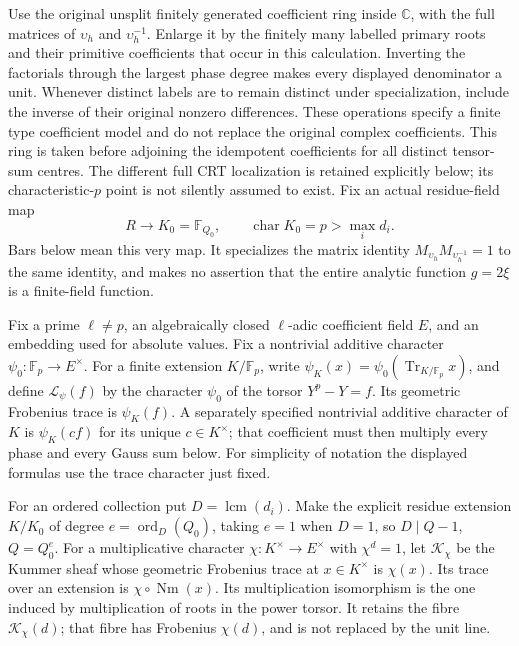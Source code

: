\documentclass[11pt,a4paper]{article}
\theoremstyle{definition}
\begin{document}
Use the original unsplit finitely generated coefficient ring inside
\(\mathbb C\), with the full matrices of \(\upsilon_h\) and
\(\upsilon_h^{-1}\).  Enlarge it by the finitely many labelled primary
roots and their primitive coefficients that occur in this calculation.
Inverting the factorials through the largest phase degree makes every
displayed denominator a unit.  Whenever distinct labels are to remain
distinct under specialization, include the inverse of their original
nonzero differences.  These operations specify a finite type coefficient
model and do not replace the original complex coefficients.
This ring is taken before adjoining the idempotent coefficients for
all distinct tensor-sum centres.  The different full CRT localization
is retained explicitly below; its characteristic-\(p\) point is not
silently assumed to exist.
Fix an actual residue-field map
\[
 R\longrightarrow K_0=\mathbb F_{Q_0},\qquad
 \operatorname{char}K_0=p>\max_i d_i.                    \tag{FF2}
\]
Bars below mean this very map.  It specializes the matrix identity
\(M_{\upsilon_h}M_{\upsilon_h^{-1}}=1\) to the same identity, and makes
no assertion that the entire analytic function \(g=2\xi\) is a
finite-field function.

Fix a prime \(\ell\ne p\), an algebraically closed \(\ell\)-adic
coefficient field \(E\), and an embedding used for absolute values.
Fix a nontrivial additive character \(\psi_0:\mathbb F_p\to E^\times\).
For a finite extension \(K/\mathbb F_p\), write
\(\psi_K(x)=\psi_0(\operatorname{Tr}_{K/\mathbb F_p}x)\), and define
\(\mathcal L_\psi(f)\) by the character \(\psi_0\) of the torsor
\(Y^p-Y=f\).  Its geometric Frobenius trace is \(\psi_K(f)\).
A separately specified nontrivial additive character of \(K\) is
\(\psi_K(cf)\) for its unique \(c\in K^\times\); that coefficient must
then multiply every phase and every Gauss sum below.  For simplicity of
notation the displayed formulas use the trace character just fixed.

For an ordered collection put \(D=\operatorname{lcm}(d_i)\).
Make the explicit residue extension \(K/K_0\) of degree
\(e=\operatorname{ord}_D(Q_0)\), taking \(e=1\) when \(D=1\), so
\(D\mid Q-1\), \(Q=Q_0^e\).  For a multiplicative character
\(\chi:K^\times\to E^\times\) with \(\chi^d=1\), let
\(\mathcal K_\chi\) be the Kummer sheaf whose geometric Frobenius
trace at \(x\in K^\times\) is \(\chi(x)\).  Its trace over an extension
is \(\chi\circ\operatorname{Nm}(x)\).  Its multiplication isomorphism
is the one induced by multiplication of roots in the power torsor.
It retains the fibre \(\mathcal K_\chi(d)\); that fibre has Frobenius
\(\chi(d)\), and is not replaced by the unit line.
\end{document}

